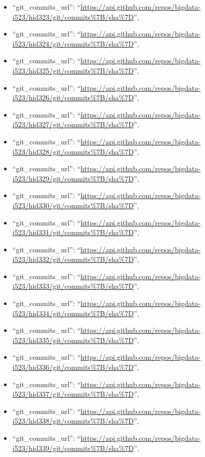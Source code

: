 \begin{itemize}
\item
  ``git\_commits\_url'':
  ``\url{https://api.github.com/repos/bigdata-i523/hid323/git/commits\%7B/sha\%7D}'',
\item
  ``git\_commits\_url'':
  ``\url{https://api.github.com/repos/bigdata-i523/hid324/git/commits\%7B/sha\%7D}'',
\item
  ``git\_commits\_url'':
  ``\url{https://api.github.com/repos/bigdata-i523/hid325/git/commits\%7B/sha\%7D}'',
\item
  ``git\_commits\_url'':
  ``\url{https://api.github.com/repos/bigdata-i523/hid326/git/commits\%7B/sha\%7D}'',
\item
  ``git\_commits\_url'':
  ``\url{https://api.github.com/repos/bigdata-i523/hid327/git/commits\%7B/sha\%7D}'',
\item
  ``git\_commits\_url'':
  ``\url{https://api.github.com/repos/bigdata-i523/hid328/git/commits\%7B/sha\%7D}'',
\item
  ``git\_commits\_url'':
  ``\url{https://api.github.com/repos/bigdata-i523/hid329/git/commits\%7B/sha\%7D}'',
\item
  ``git\_commits\_url'':
  ``\url{https://api.github.com/repos/bigdata-i523/hid330/git/commits\%7B/sha\%7D}'',
\item
  ``git\_commits\_url'':
  ``\url{https://api.github.com/repos/bigdata-i523/hid331/git/commits\%7B/sha\%7D}'',
\item
  ``git\_commits\_url'':
  ``\url{https://api.github.com/repos/bigdata-i523/hid332/git/commits\%7B/sha\%7D}'',
\item
  ``git\_commits\_url'':
  ``\url{https://api.github.com/repos/bigdata-i523/hid333/git/commits\%7B/sha\%7D}'',
\item
  ``git\_commits\_url'':
  ``\url{https://api.github.com/repos/bigdata-i523/hid334/git/commits\%7B/sha\%7D}'',
\item
  ``git\_commits\_url'':
  ``\url{https://api.github.com/repos/bigdata-i523/hid335/git/commits\%7B/sha\%7D}'',
\item
  ``git\_commits\_url'':
  ``\url{https://api.github.com/repos/bigdata-i523/hid336/git/commits\%7B/sha\%7D}'',
\item
  ``git\_commits\_url'':
  ``\url{https://api.github.com/repos/bigdata-i523/hid337/git/commits\%7B/sha\%7D}'',
\item
  ``git\_commits\_url'':
  ``\url{https://api.github.com/repos/bigdata-i523/hid338/git/commits\%7B/sha\%7D}'',
\item
  ``git\_commits\_url'':
  ``\url{https://api.github.com/repos/bigdata-i523/hid339/git/commits\%7B/sha\%7D}'',

\end{itemize}
